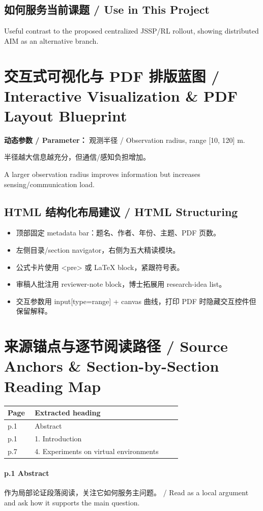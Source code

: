 \documentclass[UTF8,a4paper,11pt,fontset=fandol]{ctexart}
\begin{document}
\subsection{如何服务当前课题 / Use in This Project}
Useful contrast to the proposed centralized JSSP/RL rollout, showing distributed AIM as an alternative branch.

\section{交互式可视化与 PDF 排版蓝图 / Interactive Visualization \& PDF Layout Blueprint}
\textbf{动态参数 / Parameter：} 观测半径 / Observation radius, range [10, 120] m.

半径越大信息越充分，但通信/感知负担增加。

A larger observation radius improves information but increases sensing/communication load.

\subsection{HTML 结构化布局建议 / HTML Structuring}
\begin{itemize}
\item 顶部固定 metadata bar：题名、作者、年份、主题、PDF 页数。
\item 左侧目录/section navigator，右侧为五大精读模块。
\item 公式卡片使用 <pre> 或 LaTeX block，紧跟符号表。
\item 审稿人批注用 reviewer-note block，博士拓展用 research-idea list。
\item 交互参数用 input[type=range] + canvas 曲线，打印 PDF 时隐藏交互控件但保留解释。
\end{itemize}


\section{来源锚点与逐节阅读路径 / Source Anchors \& Section-by-Section Reading Map}
\begin{longtable}{p{0.14\linewidth}p{0.76\linewidth}}
\toprule
Page & Extracted heading\\
\midrule
p.1 & Abstract \\
p.1 & 1. Introduction \\
p.7 & 4. Experiments on virtual environments \\
\bottomrule
\end{longtable}

\paragraph{p.1 Abstract}作为局部论证段落阅读，关注它如何服务主问题。 / Read as a local argument and ask how it supports the main question.
\end{document}

